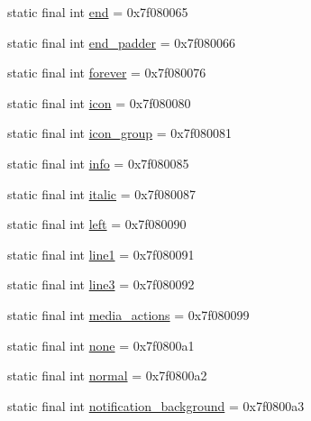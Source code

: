\begin{DoxyCompactItemize}
\item 
static final int \mbox{\hyperlink{classcom_1_1jjoe64_1_1graphview_1_1_r_1_1id_adef14f765dfbd31741ad77ad9536a4ec}{end}} = 0x7f080065
\item 
static final int \mbox{\hyperlink{classcom_1_1jjoe64_1_1graphview_1_1_r_1_1id_a58e7cf8b6c56ff515cb712c127eb3e9e}{end\+\_\+padder}} = 0x7f080066
\item 
static final int \mbox{\hyperlink{classcom_1_1jjoe64_1_1graphview_1_1_r_1_1id_ac31634a56b74d12bafdc49f1a5fe0c51}{forever}} = 0x7f080076
\item 
static final int \mbox{\hyperlink{classcom_1_1jjoe64_1_1graphview_1_1_r_1_1id_aee07149d423ef66f7a0444fd70b0d257}{icon}} = 0x7f080080
\item 
static final int \mbox{\hyperlink{classcom_1_1jjoe64_1_1graphview_1_1_r_1_1id_a13986a9d3064611f2010daa16748f3c6}{icon\+\_\+group}} = 0x7f080081
\item 
static final int \mbox{\hyperlink{classcom_1_1jjoe64_1_1graphview_1_1_r_1_1id_ab2a21f951f861d3e6790a0485182c0ba}{info}} = 0x7f080085
\item 
static final int \mbox{\hyperlink{classcom_1_1jjoe64_1_1graphview_1_1_r_1_1id_ad694c53b33297b3c0d6be35cb0b7bb50}{italic}} = 0x7f080087
\item 
static final int \mbox{\hyperlink{classcom_1_1jjoe64_1_1graphview_1_1_r_1_1id_ab391314a185866a775011eb2d165f741}{left}} = 0x7f080090
\item 
static final int \mbox{\hyperlink{classcom_1_1jjoe64_1_1graphview_1_1_r_1_1id_ada73f9f742e87c7ff557931f04a5c1dd}{line1}} = 0x7f080091
\item 
static final int \mbox{\hyperlink{classcom_1_1jjoe64_1_1graphview_1_1_r_1_1id_a26942ee280f420a3d299113d1dacac10}{line3}} = 0x7f080092
\item 
static final int \mbox{\hyperlink{classcom_1_1jjoe64_1_1graphview_1_1_r_1_1id_a75e2ad44ed6f847731dcfac19125168d}{media\+\_\+actions}} = 0x7f080099
\item 
static final int \mbox{\hyperlink{classcom_1_1jjoe64_1_1graphview_1_1_r_1_1id_a98590432f732d45608f770e502e0b6c0}{none}} = 0x7f0800a1
\item 
static final int \mbox{\hyperlink{classcom_1_1jjoe64_1_1graphview_1_1_r_1_1id_a5b9e81767b64ecd7e71d9ab15ce1547a}{normal}} = 0x7f0800a2
\item 
static final int \mbox{\hyperlink{classcom_1_1jjoe64_1_1graphview_1_1_r_1_1id_af17e5c1a7951771f338037f1cfeaf116}{notification\+\_\+background}} = 0x7f0800a3
\item 

\end{DoxyCompactItemize}
